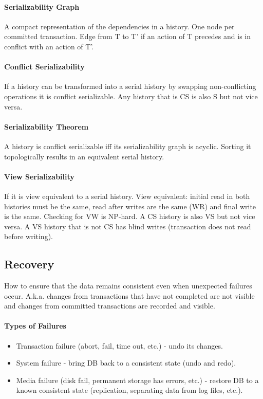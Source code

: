 \paragraph{Serializability Graph}
A compact representation of the dependencies in a history. One node per committed transaction. Edge from T to T' if an action of T precedes and is in conflict with an action of T'.

\paragraph{Conflict Serializability}
If a history can be transformed into a serial history by swapping non-conflicting operations it is conflict serializable. Any history that is CS is also S but not vice versa.

\paragraph{Serializability Theorem}
A history is conflict serializable iff its serializability graph is acyclic. Sorting it topologically results in an equivalent serial history.

\paragraph{View Serializability}
If it is view equivalent to a serial history. View equivalent: initial read in both histories must be the same, read after writes are the same (WR) and final write is the same. Checking for VW is NP-hard. A CS history is also VS but not vice versa. A VS history that is not CS has blind writes (transaction does not read before writing).



\subsection{Recovery}

How to ensure that the data remains consistent even when unexpected failures occur. A.k.a. changes from transactions that have not completed are not visible and changes from committed transactions are recorded and visible.

\paragraph{Types of Failures}
\begin{itemize}
    \item Transaction failure (abort, fail, time out, etc.) - undo its changes.
    \item System failure - bring DB back to a consistent state (undo and redo).
    \item Media failure (disk fail, permanent storage has errors, etc.) - restore DB to a known consistent state (replication, separating data from log files, etc.).
\end{itemize}

